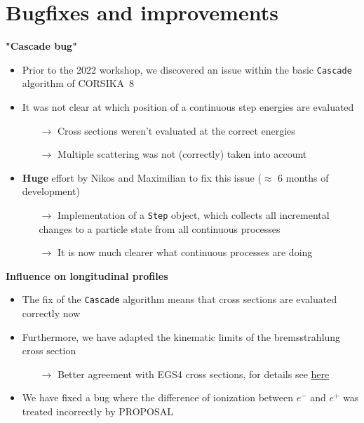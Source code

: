 \documentclass[aspectratio=1610, 9pt]{beamer}
\begin{document}
\section{Bugfixes and improvements}

\begin{frame}
\textbf{"Cascade bug"}
\vspace{5mm}
\begin{itemize}
  \item Prior to the 2022 workshop, we discovered an issue within the basic \texttt{Cascade} algorithm of CORSIKA~8
  \item It was not clear at which position of a continuous step energies are evaluated
  \begin{itemize}
    \item[$\rightarrow$] Cross sections weren't evaluated at the correct energies
    \item[$\rightarrow$] Multiple scattering was not (correctly) taken into account
  \end{itemize}
  \item \textbf{Huge} effort by Nikos and Maximilian to fix this issue ($\approx$ 6 months of development) 
  \begin{itemize}
    \item[$\rightarrow$] Implementation of a \texttt{Step} object, which collects all incremental changes to a particle state from all continuous processes
    \item[$\rightarrow$] It is now much clearer what continuous processes are doing
  \end{itemize}
\end{itemize}
\end{frame}


\begin{frame}
  \textbf{Influence on longitudinal profiles}
  \vspace{5mm}
  \begin{itemize}
    \item The fix of the \texttt{Cascade} algorithm means that cross sections are evaluated correctly now
    \item Furthermore, we have adapted the kinematic limits of the bremsstrahlung cross section
    \begin{itemize}
      \item[$\rightarrow$] Better agreement with EGS4 cross sections, for details see \href{https://github.com/tudo-astroparticlephysics/PROPOSAL/pull/308}{here}
    \end{itemize}
    \item We have fixed a bug where the difference of ionization between $e^-$ and $e^+$ was treated incorrectly by PROPOSAL
  \end{itemize}
\end{frame}
\end{document}
